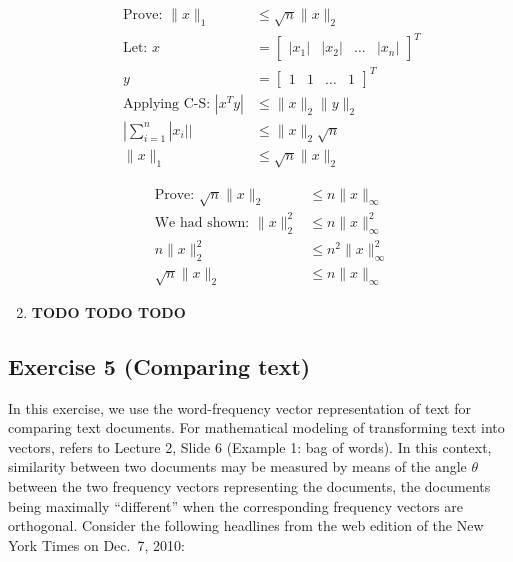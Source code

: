 \documentclass[11pt]{article}
\begin{document}
\begin{solution}
\begin{enumerate}
\begin{align*}
    \text{Prove: } \|x\|_1 &\leq \sqrt{n} \|x\|_2 \\
    \text{Let: } x &= \begin{bmatrix} |x_1| & |x_2| & \dots & |x_n| \end{bmatrix}^T \\
        y &= \begin{bmatrix} 1 & 1 & \dots & 1 \end{bmatrix}^T \\
    \text{Applying C-S: } |x^T y| &\leq \|x\|_2 \|y\|_2 \\
    | \sum_{i=1}^n |x_i| | &\leq \|x\|_2 \sqrt{n} \\
    \|x\|_1 &\leq \sqrt{n} \|x\|_2
\end{align*}

\begin{align*}
    \text{Prove: } \sqrt{n} \|x\|_2 &\leq n \|x\|_{\infty} \\
    \text{We had shown: } \|x\|_2^2 &\leq n \|x\|_{\infty}^2 \\
    n \|x\|_2^2 &\leq n^2 \|x\|_{\infty}^2 \\
    \sqrt{n} \|x\|_2 &\leq n \|x\|_{\infty}
\end{align*}

\item \textbf{TODO TODO TODO}
\end{enumerate}
\end{solution}

\newpage
\subsection*{Exercise 5 (Comparing text)}

In this exercise, we  use the word-fre\-quen\-cy vector representation of text
 for comparing  text documents. For mathematical modeling of transforming text into vectors, refers to Lecture 2, Slide 6 (Example 1: bag of words).
In this context, similarity between two documents may be measured by means of the angle $\theta$ between the two frequency vectors
representing the documents, the documents being maximally ``different'' when the corresponding frequency vectors are orthogonal.
Consider the following
headlines from the web edition of the New York Times on Dec.\ 7, 2010:
\end{document}
